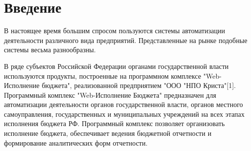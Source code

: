 \documentclass[a4paper]{extarticle}
\numberwithin{equation}{section}
\begin{document}
{\renewcommand{\contentsname}{Оглавление} \setlength{\parskip}{0cm} \tableofcontents \par}

\newpage
\section*{Введение}
В настоящее время большим спросом пользуются системы автоматизации деятельности различного вида предприятий. Представленные на рынке подобные системы весьма разнообразны.\par
В ряде субъектов Российской Федерации органами государственной власти используются продукты, построенные на программном комплексе "Web-Исполнение бюджета", реализованной предприятием "ООО "НПО Криста"[1]. Программный комплекс "Web-Исполнение Бюджета" предназначен для автоматизации деятельности органов государственной власти, органов местного самоуправления, государственных и муниципальных учреждений на всех этапах исполнения бюджета РФ. Программный комплекс позволяет организовать исполнение бюджета, обеспечивает ведения бюджетной отчетности и формирование аналитических форм отчетности.\par
\end{document}

